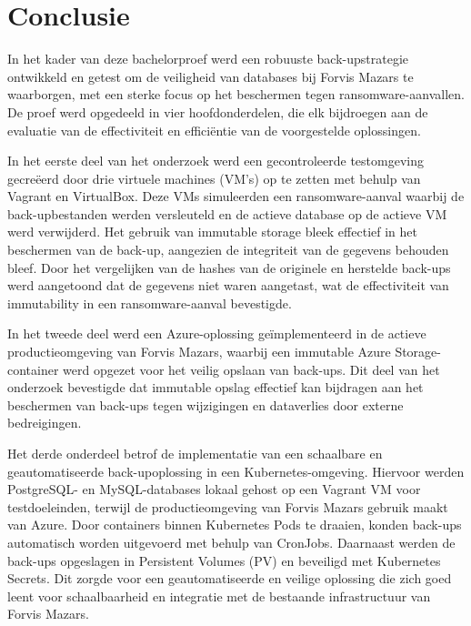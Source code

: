 
\chapter{Conclusie}%
\label{ch:conclusie}

In het kader van deze bachelorproef werd een robuuste back-upstrategie ontwikkeld en getest om de veiligheid van databases bij Forvis Mazars te waarborgen, met een sterke focus op het beschermen tegen ransomware-aanvallen. De proef werd opgedeeld in vier hoofdonderdelen, die elk bijdroegen aan de evaluatie van de effectiviteit en efficiëntie van de voorgestelde oplossingen.

In het eerste deel van het onderzoek werd een gecontroleerde testomgeving gecreëerd door drie virtuele machines (VM’s) op te zetten met behulp van Vagrant en VirtualBox. Deze VMs simuleerden een ransomware-aanval waarbij de back-upbestanden werden versleuteld en de actieve database op de actieve VM werd verwijderd. Het gebruik van immutable storage bleek effectief in het beschermen van de back-up, aangezien de integriteit van de gegevens behouden bleef. Door het vergelijken van de hashes van de originele en herstelde back-ups werd aangetoond dat de gegevens niet waren aangetast, wat de effectiviteit van immutability in een ransomware-aanval bevestigde.

In het tweede deel werd een Azure-oplossing geïmplementeerd in de actieve productieomgeving van Forvis Mazars, waarbij een immutable Azure Storage-container werd opgezet voor het veilig opslaan van back-ups. Dit deel van het onderzoek bevestigde dat immutable opslag effectief kan bijdragen aan het beschermen van back-ups tegen wijzigingen en dataverlies door externe bedreigingen.

Het derde onderdeel betrof de implementatie van een schaalbare en geautomatiseerde back-upoplossing in een Kubernetes-omgeving. Hiervoor werden PostgreSQL- en MySQL-databases lokaal gehost op een Vagrant VM voor testdoeleinden, terwijl de productieomgeving van Forvis Mazars gebruik maakt van Azure. Door containers binnen Kubernetes Pods te draaien, konden back-ups automatisch worden uitgevoerd met behulp van CronJobs. Daarnaast werden de back-ups opgeslagen in Persistent Volumes (PV) en beveiligd met Kubernetes Secrets. Dit zorgde voor een geautomatiseerde en veilige oplossing die zich goed leent voor schaalbaarheid en integratie met de bestaande infrastructuur van Forvis Mazars.

